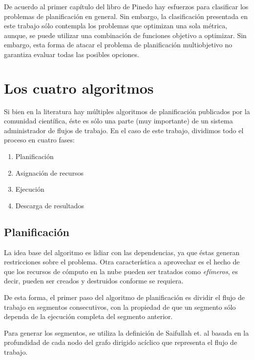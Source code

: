 De acuerdo al primer cap\'itulo del libro de Pinedo \cite{pinedo2012scheduling} hay esfuerzos para clasificar los problemas de planificación en general. Sin embargo, la clasificación presentada en este trabajo sólo contempla los problemas que optimizan una sola métrica, aunque, se puede utilizar una combinación de funciones objetivo a optimizar. Sin embargo, esta forma de atacar el problema de planificación multiobjetivo no garantiza evaluar todas las posibles opciones. 



\section{Los cuatro algoritmos}

Si bien en la literatura hay múltiples algoritmos de planificación publicados por la comunidad científica, éste es sólo una parte (muy importante) de un sistema administrador de flujos de trabajo. En el caso de este trabajo, dividimos todo el proceso en cuatro fases:

\begin{enumerate}
\item{Planificación}
\item{Asignación de recursos}
\item{Ejecución}
\item{Descarga de resultados}
\end{enumerate}



\subsection{Planificación}

La idea base del algoritmo es lidiar con las dependencias, ya que éstas generan restricciones sobre el problema. Otra característica a aprovechar es el hecho de que los recursos de cómputo en la nube pueden ser tratados como \emph{efímeros}, es decir, pueden ser creados y destruidos conforme se requiera.

De esta forma, el primer paso del algoritmo de planificación es dividir el flujo de trabajo en segmentos consecutivos, con la propiedad de que un segmento sólo dependa de la ejecución completa del segmento anterior.

Para generar los segmentos, se utiliza la definición de Saifullah et. al \cite{saifullah2013multi} basada en la profundidad de cada nodo del grafo dirigido ac\'iclico que representa el flujo de trabajo.

